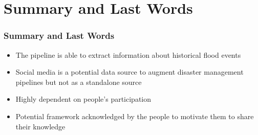 \documentclass{beamer}
\begin{document}
\section{Summary and Last Words}
\begin{frame}[t]
  \frametitle{Summary and Last Words}
\begin{itemize}
  \item The pipeline is able to extract information about historical flood events
  \item Social media is a potential data source to augment disaster management pipelines but not as a
    standalone source
  \item Highly dependent on people's participation
  \item Potential framework acknowledged by the people to motivate them to share their knowledge
\end{itemize}
\end{frame}
\end{document}
